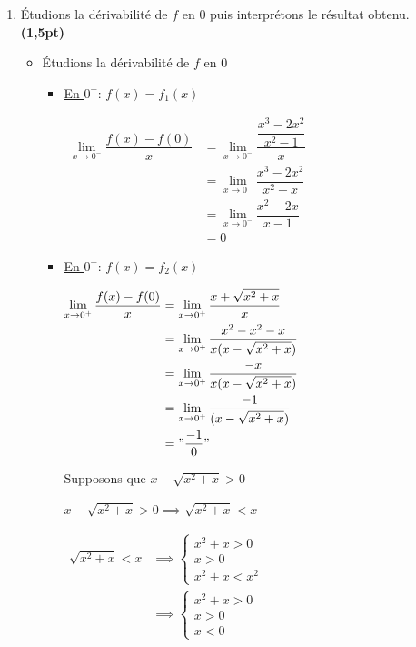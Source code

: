 \documentclass[12pt,a4paper]{article}
\begin{document}
\begin{enumerate}
\begin{enumerate}
\begin{itemize}
\end{itemize}       
        
        \item Étudions la dérivabilité de $f$ en $0$ puis interprétons le résultat obtenu. \textbf{(1,5pt)}

\begin{itemize}
\item Étudions la dérivabilité de $f$ en $0$
\begin{itemize}
\item \underline{En $0^-$}: $f(x)=f_{1}(x)$ 

\(
\begin{aligned}
 \lim\limits_{x \to 0^-} \dfrac{f(x)-f(0)}{x} &= \lim\limits_{x \to 0^-} \dfrac{\dfrac{x^3-2x^2}{x^2-1}}{x}\\
 															                &= \lim\limits_{x \to 0^-} \dfrac{x^3-2x^2}{x^2-x}\\
 															                &= \lim\limits_{x \to 0^-} \dfrac{x^2-2x}{x-1}\\
 															                &=0
\end{aligned}    
\)

\item \underline{En $0^+$}: $f(x)=f_{2}(x)$ 

\(
\begin{aligned}
\lim\limits_{x \to 0^+} \dfrac{f(x)-f(0)}{x} &=\lim\limits_{x \to 0^+} \dfrac{x + \sqrt{x^2+x}}{x}\\
															               &=\lim\limits_{x \to 0^+} \dfrac{x^2-x^2-x}{x(x - \sqrt{x^2+x})}\\
															               &=\lim\limits_{x \to 0^+} \dfrac{-x}{x(x - \sqrt{x^2+x})}\\
															               &=\lim\limits_{x \to 0^+} \dfrac{-1}{(x - \sqrt{x^2+x})}\\
															               &="\dfrac{-1}{0}"\\
\end{aligned}    
\)

Supposons que $ x - \sqrt{x^2+x} > 0 $

$ x - \sqrt{x^2+x} > 0 \implies \sqrt{x^2+x} < x $

$
\begin{aligned}
\sqrt{x^2+x} < x &\implies \begin{cases}
										x^2+x > 0\\
										x > 0\\ 
										x^2+x < x^{2} 
										\end{cases}\\
									&\implies \begin{cases}
										x^2+x > 0\\
										x > 0\\ 
										x < 0
										\end{cases}\\
\end{aligned}
$


\end{itemize}
\end{itemize}
\end{enumerate}
\end{enumerate}
\end{document}
